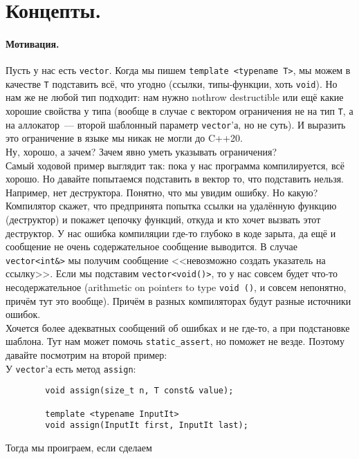 \documentclass{article}
\begin{document}
    \section{Концепты.}
    \paragraph{Мотивация.}
    Пусть у нас есть \texttt{vector}. Когда мы пишем \texttt{template <typename T>}, мы можем в качестве \texttt{T} подставить всё, что угодно (ссылки, типы-функции, хоть \texttt{void}). Но нам же не любой тип подходит: нам нужно nothrow destructible или ещё какие хорошие свойства у типа (вообще в случае с вектором ограничения не на тип \texttt{T}, а на аллокатор~--- второй шаблонный параметр \texttt{vector}'а, но не суть). И выразить это ограничение в языке мы никак не могли до C++20.\\
    Ну, хорошо, а зачем? Зачем явно уметь указывать ограничения?\\
    Самый ходовой пример выглядит так: пока у нас программа компилируется, всё хорошо. Но давайте попытаемся подставить в вектор то, что подставить нельзя. Например, нет деструктора. Понятно, что мы увидим ошибку. Но какую? Компилятор скажет, что предпринята попытка ссылки на удалённую функцию (деструктор) и покажет цепочку функций, откуда и кто хочет вызвать этот деструктор. У нас ошибка компиляции где-то глубоко в коде зарыта, да ещё и сообщение не очень содержательное сообщение выводится. В случае \texttt{vector<int&>} мы получим сообщение <<невозможно создать указатель на ссылку>>. Если мы подставим \texttt{vector<void()>}, то у нас совсем будет что-то несодержательное (arithmetic on pointers to type \texttt{void ()}, и совсем непонятно, причём тут это вообще). Причём в разных компиляторах будут разные источники ошибок.\\
    Хочется более адекватных сообщений об ошибках и не где-то, а при подстановке шаблона. Тут нам может помочь \texttt{static_assert}, но поможет не везде. Поэтому давайте посмотрим на второй пример:\\
    У \texttt{vector}'а есть метод \texttt{assign}:
    \begin{verbatim}
        void assign(size_t n, T const& value);

        template <typename InputIt>
        void assign(InputIt first, InputIt last);
    \end{verbatim}
    Тогда мы проиграем, если сделаем
\end{document}
